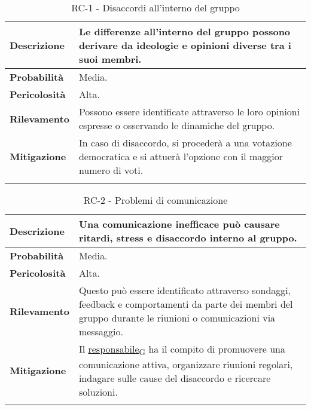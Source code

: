 \begin{longtable}{ | l | p{12cm} | }
	\hline
	\textbf{Descrizione}  & Le differenze all'interno del gruppo possono derivare da ideologie e opinioni diverse tra i suoi membri.              \\
	\hline
	\textbf{Probabilità}  & Media.                                                                                                                \\
	\hline
	\textbf{Pericolosità} & Alta.                                                                                                                 \\
	\hline
	\textbf{Rilevamento}  & Possono essere identificate attraverso le loro opinioni espresse o osservando le dinamiche del gruppo.                \\
	\hline
	\textbf{Mitigazione}  & In caso di disaccordo, si procederà a una votazione democratica e si attuerà l'opzione con il maggior numero di voti. \\
	\hline
	\caption{RC-1 - Disaccordi all'interno del gruppo}
\end{longtable}


\begin{longtable}{ | l | p{12cm} | }
	\hline
	\textbf{Descrizione}  & Una comunicazione inefficace può causare ritardi, stress e disaccordo interno al gruppo.                                                                        \\
	\hline
	\textbf{Probabilità}  & Media.                                                                                                                                                          \\
	\hline
	\textbf{Pericolosità} & Alta.                                                                                                                                                           \\
	\hline
	\textbf{Rilevamento}  & Questo può essere identificato attraverso sondaggi, feedback e comportamenti da parte dei membri del gruppo durante le riunioni o comunicazioni via messaggio.  \\
	\hline
	\textbf{Mitigazione}  & Il \href{https://7last.github.io/docs/rtb/documentazione-interna/glossario\#responsabile}{responsabile\textsubscript{G}} ha il compito di promuovere una comunicazione attiva, organizzare riunioni regolari, indagare sulle cause del disaccordo e ricercare soluzioni. \\
	\hline
	\caption{RC-2 - Problemi di comunicazione}
\end{longtable}
